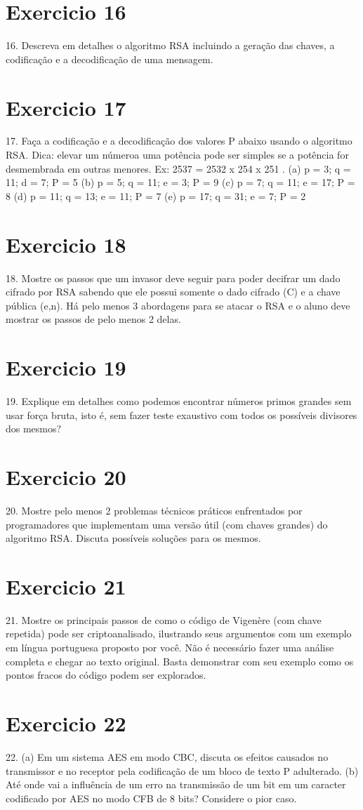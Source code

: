 \documentclass[10pt,a4paper]{article}
\begin{document}
\section*{Exercicio 16}
16. Descreva em detalhes o algoritmo RSA incluindo a geração das chaves, a codificação e a decodificação de uma mensagem.
\section*{Exercicio 17}
17. Faça a codificação e a decodificação dos valores P abaixo usando o algoritmo RSA. Dica: elevar um númeroa uma potência pode ser simples se a potência for desmembrada em outras menores. Ex: 2537 = 2532 x 254 x 251 .
(a) p = 3; q = 11; d = 7; P = 5
(b) p = 5; q = 11; e = 3; P = 9
(c) p = 7; q = 11; e = 17; P = 8
(d) p = 11; q = 13; e = 11; P = 7
(e) p = 17; q = 31; e = 7; P = 2
\section*{Exercicio 18}
18. Mostre os passos que um invasor deve seguir para poder decifrar um dado cifrado por RSA sabendo que ele possui somente o dado cifrado (C) e a chave pública (e,n). Há pelo menos 3 abordagens para se atacar o RSA e o aluno deve mostrar os passos de pelo menos 2 delas.
\section*{Exercicio 19}
19. Explique em detalhes como podemos encontrar números primos grandes sem usar força bruta, isto é, sem fazer teste exaustivo com todos os possíveis divisores dos mesmos?
\section*{Exercicio 20}
20. Mostre pelo menos 2 problemas técnicos práticos enfrentados por programadores que implementam uma versão útil (com chaves grandes) do algoritmo RSA. Discuta possíveis soluções para os mesmos.
\section*{Exercicio 21}
21. Mostre os principais passos de como o código de Vigenère (com chave repetida) pode ser criptoanalisado, ilustrando seus argumentos com um exemplo em língua portuguesa proposto por você. Não é necessário fazer uma análise completa e chegar ao texto original. Basta demonstrar com seu exemplo como os pontos fracos do código podem ser explorados.
\section*{Exercicio 22}
22. (a) Em um sistema AES em modo CBC, discuta os efeitos causados no transmissor e no receptor pela codificação de um bloco de texto P adulterado.
(b) Até onde vai a influência de um erro na transmissão de um bit em um caracter codificado por AES no modo CFB de 8 bits? Considere o pior caso.
\end{document}
